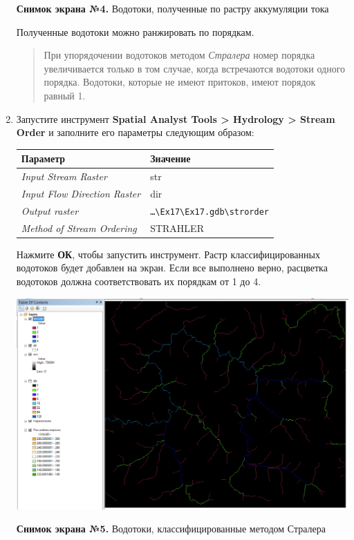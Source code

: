 \documentclass[]{book}
\theoremstyle{definition}
\theoremstyle{definition}
\theoremstyle{definition}
\theoremstyle{remark}
\begin{document}
\begin{enumerate}
  \textbf{Снимок экрана №4.} Водотоки, полученные по растру аккумуляции
  тока

  Полученные водотоки можно ранжировать по порядкам.

  \begin{quote}
  При упорядочении водотоков методом \emph{Стралера} номер порядка
  увеличивается только в том случае, когда встречаются водотоки одного
  порядка. Водотоки, которые не имеют притоков, имеют порядок равный 1.
  \end{quote}
\item
  Запустите инструмент \textbf{Spatial Analyst Tools \textgreater{}
  Hydrology \textgreater{} Stream Order} и заполните его параметры
  следующим образом:

  \begin{longtable}[]{@{}ll@{}}
  \toprule
  Параметр & Значение\tabularnewline
  \midrule
  \endhead
  \emph{Input Stream Raster} & str\tabularnewline
  \emph{Input Flow Direction Raster} & dir\tabularnewline
  \emph{Output raster} &
  \texttt{\ldots{}\textbackslash{}Ex17\textbackslash{}Ex17.gdb\textbackslash{}strorder}\tabularnewline
  \emph{Method of Stream Ordering} & STRAHLER\tabularnewline
  \bottomrule
  \end{longtable}

  Нажмите \textbf{ОК}, чтобы запустить инструмент. Растр
  классифицированных водотоков будет добавлен на экран. Если все
  выполнено верно, расцветка водотоков должна соответствовать их
  порядкам от 1 до 4.

  \includegraphics{images/Ex17/image15.png}

  \textbf{Снимок экрана №5.} Водотоки, классифицированные методом
  Стралера
\end{enumerate}
\end{document}
